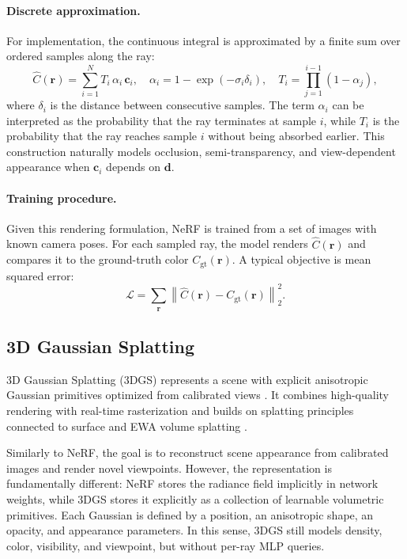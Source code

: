 \paragraph{Discrete approximation.}
For implementation, the continuous integral is approximated by a finite sum over ordered samples along the ray:
\[
\hat{C}(\mathbf{r})=\sum_{i=1}^{N}T_i\,\alpha_i\,\mathbf{c}_i,\quad
\alpha_i=1-\exp(-\sigma_i\delta_i),\quad
T_i=\prod_{j=1}^{i-1}(1-\alpha_j),
\]
where $\delta_i$ is the distance between consecutive samples. The term $\alpha_i$ can be interpreted as the probability that the ray terminates at sample $i$, while $T_i$ is the probability that the ray reaches sample $i$ without being absorbed earlier. This construction naturally models occlusion, semi-transparency, and view-dependent appearance when $\mathbf{c}_i$ depends on $\mathbf{d}$.

\paragraph{Training procedure.}
Given this rendering formulation, NeRF is trained from a set of images with known camera poses. For each sampled ray, the model renders $\hat{C}(\mathbf{r})$ and compares it to the ground-truth color $C_{\text{gt}}(\mathbf{r})$. A typical objective is mean squared error:
\[
\mathcal{L} = \sum_{\mathbf{r}}\left\|\hat{C}(\mathbf{r})-C_{\text{gt}}(\mathbf{r})\right\|_2^2.
\]


\subsection{3D Gaussian Splatting}
3D Gaussian Splatting (3DGS) represents a scene with explicit anisotropic Gaussian primitives optimized from calibrated views \cite{kerbl2023gaussian}. It combines high-quality rendering with real-time rasterization and builds on splatting principles connected to surface and EWA volume splatting \cite{zwicker2001surface,zwicker2002ewa}.

Similarly to NeRF, the goal is to reconstruct scene appearance from calibrated images and render novel viewpoints. However, the representation is fundamentally different: NeRF stores the radiance field implicitly in network weights, while 3DGS stores it explicitly as a collection of learnable volumetric primitives. Each Gaussian is defined by a position, an anisotropic shape, an opacity, and appearance parameters. In this sense, 3DGS still models density, color, visibility, and viewpoint, but without per-ray MLP queries.

